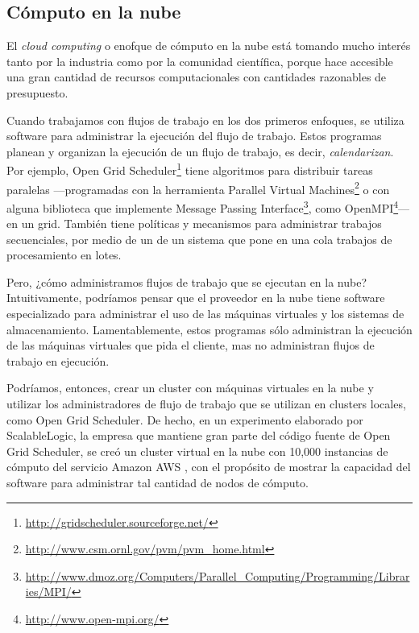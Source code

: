 \documentclass[letterpaper, 12pt]{report}
\begin{document}
\subsection*{Cómputo en la nube}

El \emph{cloud computing} o enofque de cómputo en la nube está tomando mucho interés tanto por la industria como por la comunidad científica, porque hace accesible una gran cantidad de recursos computacionales con cantidades razonables de presupuesto.

Cuando trabajamos con flujos de trabajo en los dos primeros enfoques, se utiliza software para administrar la ejecución del flujo de trabajo. Estos programas planean y organizan la ejecución de un flujo de trabajo, es decir, \emph{calendarizan}. Por ejemplo, Open Grid Scheduler\footnote{\label{fn:note1}\url{http://gridscheduler.sourceforge.net/}} tiene algoritmos para distribuir tareas paralelas —programadas con la herramienta Parallel Virtual Machines\footnote{\url{http://www.csm.ornl.gov/pvm/pvm_home.html}} o con alguna biblioteca que implemente Message Passing Interface\footnote{ \url{http://www.dmoz.org/Computers/Parallel_Computing/Programming/Libraries/MPI/} }, como OpenMPI\footnote{ \url{http://www.open-mpi.org/} }— en un grid. También tiene políticas y mecanismos para administrar trabajos secuenciales, por medio de un de un sistema que pone en una cola trabajos de procesamiento en lotes.

Pero, ¿cómo administramos flujos de trabajo que se ejecutan en la nube? Intuitivamente, podríamos pensar que el proveedor en la nube tiene software especializado para administrar el uso de las máquinas virtuales y los sistemas de almacenamiento. Lamentablemente, estos programas sólo administran la ejecución de las máquinas virtuales que pida el cliente, mas no administran flujos de trabajo en ejecución. 

Podríamos, entonces, crear un cluster con máquinas virtuales en la nube y utilizar los administradores de flujo de trabajo que se utilizan en clusters locales, como Open Grid Scheduler. De hecho, en un experimento elaborado por ScalableLogic, la empresa que mantiene gran parte del código fuente de Open Grid Scheduler, se creó un cluster virtual en la nube con 10,000 instancias de cómputo del servicio Amazon AWS \cite{blog2012ogs}, con el propósito de mostrar la capacidad del software para administrar tal cantidad de nodos de cómputo.
\end{document}
